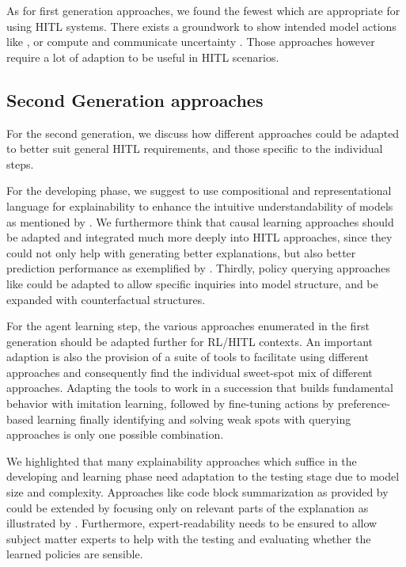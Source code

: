 \documentclass[twoside,11pt]{article}
\begin{document}
As for first generation approaches, we found the fewest which are appropriate for using HITL systems. There exists a groundwork to show intended model actions like \cite{Caltagarione:2017:DrivingPathGeneration}, or compute and communicate uncertainty \citep{JainEtAl:2021:EpistemicUncertaintyPrediction}. Those approaches however require a lot of adaption to be useful in HITL scenarios.

\subsection{Second Generation approaches}

For the second generation, we discuss how different approaches could be adapted to better suit general HITL requirements, and those specific to the individual steps.


For the developing phase, we suggest to use compositional and representational language for explainability to enhance the intuitive understandability of models as mentioned by \citet{RoyEtAl:2021:RLRoboticsChallenges}. We furthermore think that causal learning approaches should be adapted and integrated much more deeply into HITL approaches, since they could not only help with generating better explanations, but also better prediction performance as exemplified by \citet{MadumalEtAl:2020:CausalRLCFs}. Thirdly, policy querying approaches like \citet{HayesShah:2017:AutonomousPolicyExplanation} could be adapted to allow specific inquiries into model structure, and be expanded with counterfactual structures.


For the agent learning step, the various approaches enumerated in the first generation should be adapted further for RL/HITL contexts. An important adaption is also the provision of a suite of tools to facilitate using different approaches and consequently find the individual sweet-spot mix of different approaches. Adapting the tools to work in a succession that builds fundamental behavior with imitation learning, followed by fine-tuning actions by preference-based learning finally identifying and solving weak spots with querying approaches is only one possible combination.


We highlighted that many explainability approaches which suffice in the developing and learning phase need adaptation to the testing stage due to model size and complexity. Approaches like code block summarization as provided by \citet{VermaEtAl:2018:ProgrammaticallyInterpretableRL} could be extended by focusing only on relevant parts of the explanation as illustrated by \citet{Vu:2020:PGMExplainer}. Furthermore, expert-readability needs to be ensured to allow subject matter experts to help with the testing and evaluating whether the learned policies are sensible.
\end{document}
